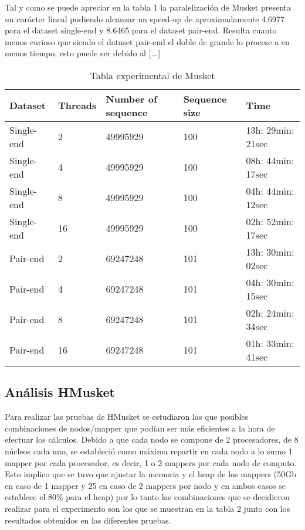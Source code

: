 \documentclass[conference]{IEEEtran}
\begin{document}
Tal y como se puede apreciar en la tabla 1 la paralelización de Musket presenta un carácter lineal pudiendo alcanzar un speed-up de aproximadamente 4.6977 para el dataset single-end y 8.6465 para el dataset pair-end. Resulta cuanto menos curioso que siendo el dataset pair-end el doble de grande lo procese a en menos tiempo, esto puede ser debido al [...]

\begin{table}[]
	\centering
	\caption{Tabla experimental de Musket}
	\label{tabla 1}
	\begin{tabular}{|l|l|l|l|l|}
		\hline
		\textbf{Dataset} 	& \textbf{Threads} 	& \textbf{Number of sequence} & \textbf{Sequence size} & \textbf{Time} 				\\ \hline
		Single-end 	& 2			& 49995929           & 100           & 13h: 29min: 21sec 	\\ \hline
		Single-end 	& 4			& 49995929           & 100           & 08h: 44min: 17sec	\\ \hline
		Single-end 	& 8			& 49995929           & 100           & 04h: 44min: 12sec 	\\ \hline
		Single-end 	& 16		& 49995929           & 100           & 02h: 52min: 17sec 	\\ \hline \hline
		Pair-end 	& 2			& 69247248           & 101           & 13h: 30min: 02sec 	\\ \hline
		Pair-end 	& 4			& 69247248           & 101           & 04h: 30min: 15sec	\\ \hline
		Pair-end 	& 8			& 69247248           & 101           & 02h: 24min: 34sec 	\\ \hline
		Pair-end 	& 16		& 69247248           & 101           & 01h: 33min: 41sec 	\\ \hline
	\end{tabular}
\end{table}

\subsection{Análisis HMusket}
Para realizar las pruebas de HMusket se estudiaron las que posibles combinaciones de nodos/mapper que podían ser más eficientes a la hora de efectuar los cálculos. Debido a que cada nodo se compone de 2 procesadores, de 8 núcleos cada uno, se estableció como máxima repartir en cada nodo a lo sumo 1 mapper por cada procesador, es decir, 1 o 2 mappers por cada nodo de computo. Esto implico que se tuvo que ajustar la memoria y el heap de los mappers (50Gb en caso de 1 mapper y 25 en caso de 2 mappers por nodo y en ambos casos se establece el 80\% para el heap) por lo tanto las combinaciones que se decidieron realizar para el experimento son los que se muestran en la tabla 2 junto con los resultados obtenidos en las diferentes pruebas.\\
\end{document}
